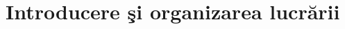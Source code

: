 \documentclass[oneside, 12pt]{book}
\begin{document}
\setcounter{tocdepth}{2}
\tableofcontents







\chapter*{Introducere şi organizarea lucrării}
\end{document}
